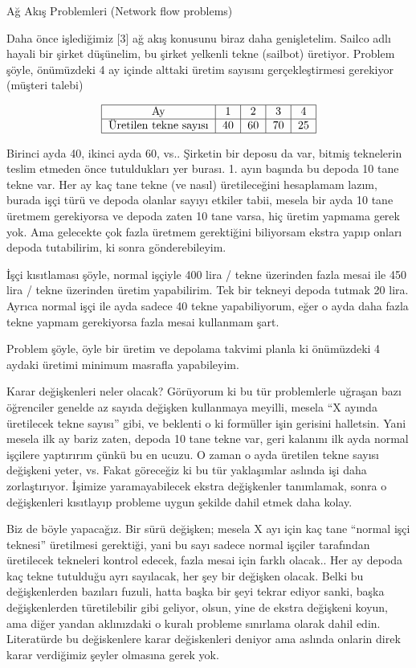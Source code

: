 \documentclass[12pt,fleqn]{article}\usepackage{../../common}
\begin{document}
Ağ Akış Problemleri (Network flow problems)

Daha önce işlediğimiz [3] ağ akış konusunu biraz daha genişletelim. Sailco
adlı hayali bir şirket düşünelim, bu şirket yelkenli tekne (sailbot)
üretiyor. Problem şöyle, önümüzdeki 4 ay içinde alttaki üretim sayısını
gerçekleştirmesi gerekiyor (müşteri talebi)

$$ 
\begin{tabular}{|c|c|c|c|c|}
\hline
\textrm{Ay} & 1 & 2 & 3 & 4 \\
\hline
\textrm{Üretilen tekne sayısı} & 40 & 60 & 70 & 25 \\
\hline
\end{tabular}
$$

Birinci ayda 40, ikinci ayda 60, vs.. Şirketin bir deposu da var, bitmiş
teknelerin teslim etmeden önce tutuldukları yer burası. 1. ayın başında bu
depoda 10 tane tekne var. Her ay kaç tane tekne (ve nasıl) üretileceğini
hesaplamam lazım, burada işçi türü ve depoda olanlar sayıyı etkiler tabii,
mesela bir ayda 10 tane üretmem gerekiyorsa ve depoda zaten 10 tane varsa,
hiç üretim yapmama gerek yok. Ama gelecekte çok fazla üretmem gerektiğini
biliyorsam ekstra yapıp onları depoda tutabilirim, ki sonra gönderebileyim.

İşçi kısıtlaması şöyle, normal işçiyle 400 lira / tekne üzerinden fazla
mesai ile 450 lira / tekne üzerinden üretim yapabilirim. Tek bir tekneyi
depoda tutmak 20 lira. Ayrıca normal işçi ile ayda sadece 40 tekne
yapabiliyorum, eğer o ayda daha fazla tekne yapmam gerekiyorsa fazla mesai
kullanmam şart.

Problem şöyle, öyle bir üretim ve depolama takvimi planla ki önümüzdeki 4
aydaki üretimi minimum masrafla yapabileyim. 

Karar değişkenleri neler olacak? Görüyorum ki bu tür problemlerle uğraşan
bazı öğrenciler genelde az sayıda değişken kullanmaya meyilli, mesela ``X
ayında üretilecek tekne sayısı'' gibi, ve beklenti o ki formüller işin
gerisini halletsin. Yani mesela ilk ay bariz zaten, depoda 10 tane tekne
var, geri kalanını ilk ayda normal işçilere yaptırırım çünkü bu en ucuzu. O
zaman o ayda üretilen tekne sayısı değişkeni yeter, vs. Fakat göreceğiz ki
bu tür yaklaşımlar aslında işi daha zorlaştırıyor. İşimize yaramayabilecek
ekstra değişkenler tanımlamak, sonra o değişkenleri kısıtlayıp probleme
uygun şekilde dahil etmek daha kolay.

Biz de böyle yapacağız. Bir sürü değişken; mesela X ayı için kaç tane
``normal işçi teknesi'' üretilmesi gerektiği, yani bu sayı sadece normal
işçiler tarafından üretilecek tekneleri kontrol edecek, fazla mesai için
farklı olacak.. Her ay depoda kaç tekne tutulduğu ayrı sayılacak, her şey
bir değişken olacak. Belki bu değişkenlerden bazıları fuzuli, hatta başka
bir şeyi tekrar ediyor sanki, başka değişkenlerden türetilebilir gibi
geliyor, olsun, yine de ekstra değişkeni koyun, ama diğer yandan
aklınızdaki o kuralı probleme sınırlama olarak dahil edin. Literatürde bu
değiskenlere karar değiskenleri deniyor ama aslında onlarin direk karar
verdiğimiz şeyler olmasına gerek yok.
\end{document}
